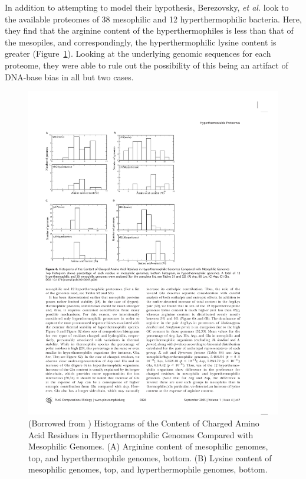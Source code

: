 In addition to attempting to model their hypothesis, Berezovsky, \emph{et al.} look to the available proteomes of 38 mesophilic and 12 hyperthermophilic bacteria. Here, they find that the arginine content of the hyperthermophiles is less than that of the mesopiles, and correspondingly, the hyperthermophilic lysine content is greater (Figure~\ref{fig:aa_content}). Looking at the underlying genomic sequences for each proteome, they were able to rule out the possibility of this being an artifact of DNA-base bias in all but two cases.

\begin{figure}[h]
	\center
	\includegraphics{aa_content}
	\caption{(Borrowed from \cite{Berezovsky:2005p40}) Histograms of the Content of Charged Amino Acid Residues in Hyperthermophilic Genomes Compared with Mesophilic Genomes. (A) Arginine content of mesophilic genomes, top, and hyperthermophile genomes, bottom. (B) Lysine content of mesophilic genomes, top, and hyperthermophile genomes, bottom. }
	\label{fig:aa_content}
\end{figure}

